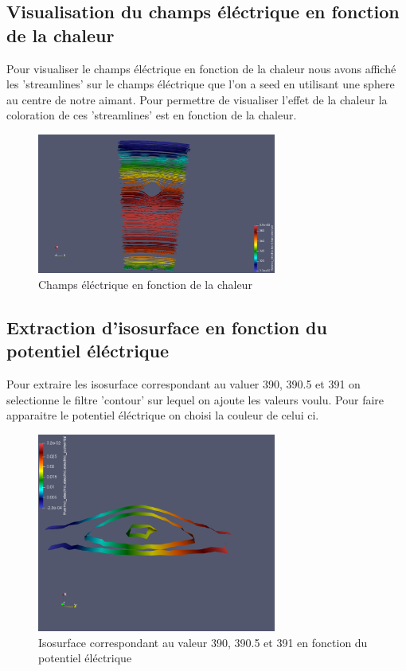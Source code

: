 \subsection{Visualisation du champs éléctrique en fonction de la chaleur}
Pour visualiser le champs éléctrique en fonction de la chaleur 
nous avons affiché les 'streamlines' sur le champs éléctrique que l'on a seed en utilisant une sphere au centre de notre aimant. 
Pour permettre de visualiser l'effet de la chaleur la coloration de ces 'streamlines' est en fonction de la chaleur.
\begin{figure}[h]
    \centering
    \includegraphics[width=0.7\textwidth]{images/champ_electrique.png}
    \caption{Champs éléctrique en fonction de la chaleur}
\end{figure}
\subsection{Extraction d'isosurface en fonction du potentiel éléctrique}
Pour extraire les isosurface correspondant au valuer 390, 390.5 et 391 on selectionne le filtre 'contour' sur lequel on ajoute les valeurs voulu.
Pour faire apparaitre le potentiel éléctrique on choisi la couleur de celui ci. 
\begin{figure}[h]
    \centering
    \includegraphics[width=0.7\textwidth]{images/isosurface.png}
    \caption{Isosurface correspondant au valeur 390, 390.5 et 391 en fonction du potentiel éléctrique}
\end{figure}
 